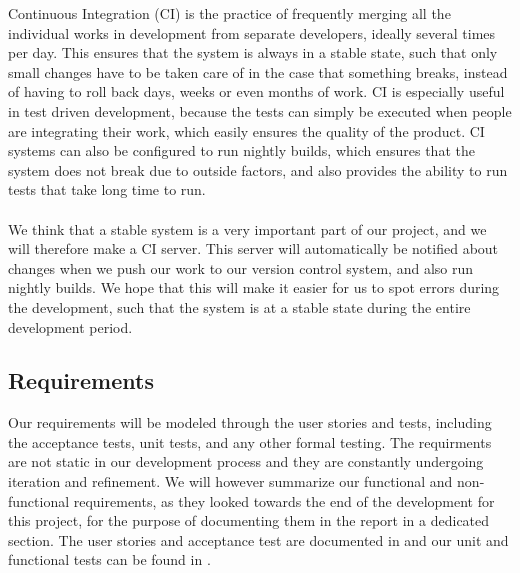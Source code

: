 Continuous Integration (CI) is the practice of frequently merging all the individual works in development from separate developers, ideally several times per day. This ensures that the system is always in a stable state, such that only small changes have to be taken care of in the case that something breaks, instead of having to roll back days, weeks or even months of work. CI is especially useful in test driven development, because the tests can simply be executed when people are integrating their work, which easily ensures the quality of the product. CI systems can also be configured to run nightly builds, which ensures that the system does not break due to outside factors, and also provides the ability to run tests that take long time to run.
\\\\
We think that a stable system is a very important part of our project, and we will therefore make a CI server. This server will automatically be notified about changes when we push our work to our version control system, and also run nightly builds. We hope that this will make it easier for us to spot errors during the development, such that the system is at a stable state during the entire development period. 

\subsection{Requirements}

Our requirements will be modeled through the user stories and tests, including the acceptance tests, unit tests, and any other formal testing. The requirments are not static in our development process and they are constantly undergoing iteration and refinement. We will however summarize our functional and non-functional requirements, as they looked towards the end of the development for this project, for the purpose of documenting them in the report in a dedicated section. The user stories and acceptance test are documented in  and our unit and functional tests can be found in .

